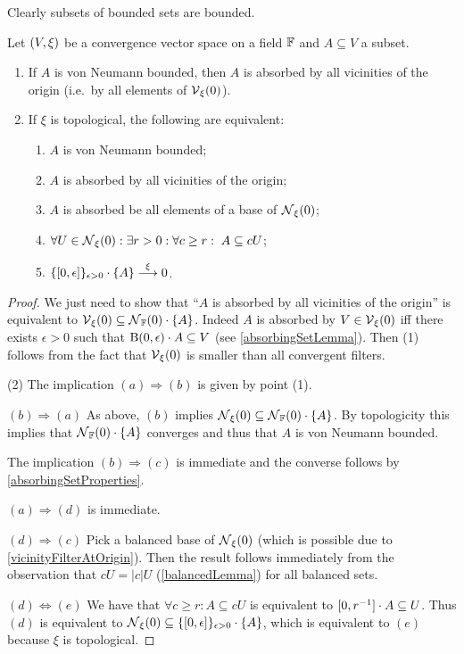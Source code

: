 Clearly subsets of bounded sets are bounded.

\begin{lemma} \label{vonNeumannBoundednessAbsorption}
Let $\sSet{V,\xi}$ be a convergence vector space on a field $\mathbb{F}$ and $A\subseteq V$ a subset. 
\begin{enumerate}
\item If $A$ is von Neumann bounded, then $A$ is absorbed by all vicinities of the origin (i.e.\ by all elements of $\operatorname{\mathcal{V}}_{\xi}(0)$).
\item If $\xi$ is topological, the following are equivalent:
\begin{enumerate}
\item $A$ is von Neumann bounded;
\item $A$ is absorbed by all vicinities of the origin;
\item $A$ is absorbed be all elements of a base of $\operatorname{\mathcal{N}}_\xi(0)$;
\item $\forall U\in \operatorname{\mathcal{N}}_{\xi}(0): \exists r > 0: \forall c \geq r: \; A \subseteq cU$;
\item $\{\interval{0,\epsilon}\}_{\epsilon >0}\cdot \{A\} \overset{\xi}{\longrightarrow} 0$.
\end{enumerate}
\end{enumerate}
\end{lemma}
\begin{proof}
We just need to show that ``$A$ is absorbed by all vicinities of the origin'' is equivalent to $\operatorname{\mathcal{V}}_\xi(0) \subseteq \operatorname{\mathcal{N}}_{\mathbb{F}}(0) \cdot \{A\}$. Indeed $A$ is absorbed by $V\in \operatorname{\mathcal{V}}_\xi(0)$ iff there exists $\epsilon >0$ such that $\operatorname{B}(0,\epsilon)\cdot A \subseteq V$ (see \ref{absorbingSetLemma}). Then (1) follows from the fact that $\operatorname{\mathcal{V}}_\xi(0)$ is smaller than all convergent filters.

(2) The implication $(a) \Rightarrow (b)$ is given by point (1).

$(b)\Rightarrow (a)$ As above, $(b)$ implies $\operatorname{\mathcal{N}}_\xi(0) \subseteq \operatorname{\mathcal{N}}_{\mathbb{F}}(0) \cdot \{A\}$. By topologicity this implies that $\operatorname{\mathcal{N}}_{\mathbb{F}}(0) \cdot \{A\}$ converges and thus that $A$ is von Neumann bounded.

The implication $(b)\Rightarrow (c)$ is immediate and the converse follows by \ref{absorbingSetProperties}.

$(a) \Rightarrow (d)$ is immediate.

$(d) \Rightarrow (c)$ Pick a balanced base of $\operatorname{\mathcal{N}}_{\xi}(0)$ (which is possible due to \ref{vicinityFilterAtOrigin}). Then the result follows immediately from the observation that $cU = |c|U$ (\ref{balancedLemma}) for all balanced sets.

$(d) \Leftrightarrow (e)$ We have that $\forall c \geq r: A\subseteq cU$ is equivalent to $\interval{0,r^{-1}}\cdot A \subseteq U$. Thus $(d)$ is equivalent to $\neighbourhood_\xi(0)\subseteq \{\interval{0,\epsilon}\}_{\epsilon >0}\cdot \{A\}$, which is equivalent to $(e)$ because $\xi$ is topological.
\end{proof}


